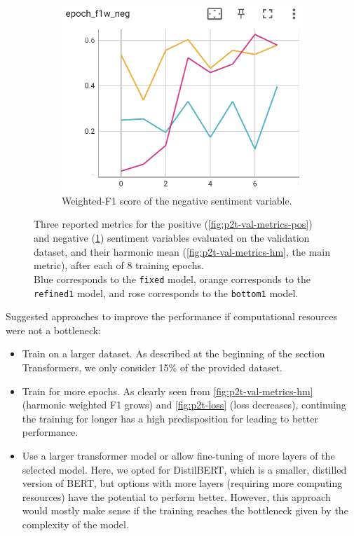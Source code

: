 \begin{figure}
\begin{subfigure}[t]{0.3\textwidth}
    \end{subfigure}
    \hfill
    \begin{subfigure}[t]{0.3\textwidth}
        \includegraphics[width=\textwidth]{images/distilbert_val_f1w_neg.png}
        \caption{Weighted-F1 score of the negative sentiment variable.}
        \label{fig:p2t-val-metrics-neg}
    \end{subfigure}
    \caption{Three reported metrics for the positive (\cref{fig:p2t-val-metrics-pos}) and negative (\cref{fig:p2t-val-metrics-neg}) sentiment variables evaluated on the validation dataset, and their harmonic mean (\cref{fig:p2t-val-metrics-hm}, the main metric), after each of 8 training epochs.\\
    Blue  corresponds to the \texttt{fixed} model, orange  corresponds to the \texttt{refined1} model, and rose  corresponds to the \texttt{bottom1} model.}
    \label{fig:p2t-val-metrics}
\end{figure}

Suggested approaches to improve the performance if computational resources were not a bottleneck:
\begin{itemize}
    \item Train on a larger dataset. As described at the beginning of the section Transformers, we only consider 15\% of the provided dataset.
    \item Train for more epochs. As clearly seen from \cref{fig:p2t-val-metrics-hm} (harmonic weighted F1 grows) and \cref{fig:p2t-loss} (loss decreases), continuing the training for longer has a high predisposition for leading to better performance.
    \item Use a larger transformer model or allow fine-tuning of more layers of the selected model. Here, we opted for DistilBERT, which is a smaller, distilled version of BERT, but options with more layers (requiring more computing resources) have the potential to perform better. However, this approach would mostly make sense if the training reaches the bottleneck given by the complexity of the model.
\end{itemize}

